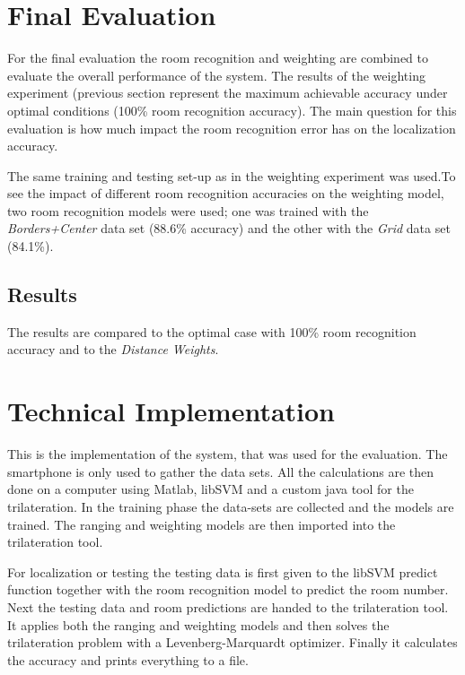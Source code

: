 \section{Final Evaluation}

For the final evaluation the room recognition and weighting are combined to evaluate the overall performance of the system. The results of the weighting experiment (previous section  represent the maximum achievable accuracy under optimal conditions (100\% room recognition accuracy).  The main question for this evaluation is how much impact the room recognition error has on the localization accuracy.

The same training and testing set-up as in the weighting experiment was used.To see the impact of different room recognition accuracies on the weighting model, two room recognition models were used; one was trained with the \emph{Borders+Center} data set (88.6\% accuracy) and the other with the \emph{Grid} data set (84.1\%).

\subsection{Results}

The results are compared to the optimal case with 100\% room recognition accuracy and to the \emph{Distance Weights}.

\section{Technical Implementation}
\label{technicalImplementation}

This is the implementation of the system, that was used for the evaluation. The smartphone is only used to gather the data sets. All the calculations are then done on a computer using Matlab, libSVM and a custom java tool for the trilateration. In the training phase the data-sets are collected and the models are trained. The ranging and weighting models are then imported into the trilateration tool.

For localization or testing the testing data is first given to the libSVM predict function together with the room recognition model to predict the room number. Next the testing data and room predictions are handed to the trilateration tool. It applies both the ranging and weighting models and then solves the trilateration problem with a Levenberg-Marquardt optimizer. Finally it calculates the accuracy and prints everything to a file.

